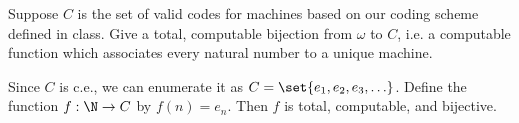 \begin{problem}
  Suppose $C$ is the set of valid codes for machines based on
  our coding scheme defined in class. Give a total, computable
  bijection from $\omega$ to $C$,
  i.e. a computable function which associates every natural number
  to a unique machine. 

  \begin{answer}
    Since $C$ is c.e.,
    we can enumerate it as $C = \set{ e_1, e_2, e_3, \ldots }$.
    Define the function $f : \N \to C$ by $f(n) = e_n$.
    Then $f$ is total, computable, and bijective.
  \end{answer}
\end{problem}
